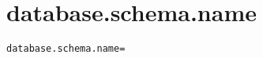 \section{database.schema.name}
\label{configuration:DatabaseSchemaName}
\ClearAPI
\TODO
{}
\begin{lstlisting}[style=Props,caption={Usage example for \textit{database.schema.name}}]
database.schema.name=
\end{lstlisting}
